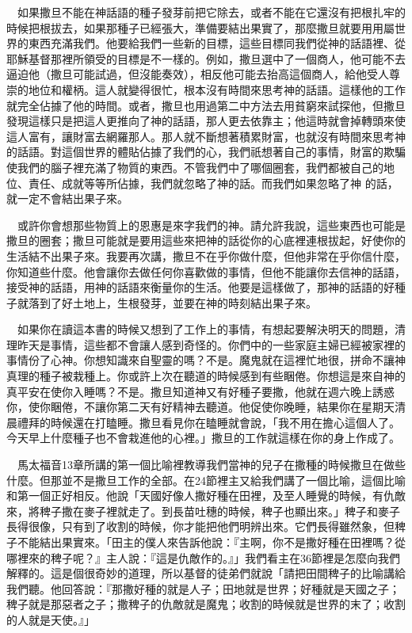 \documentclass{book}
\begin{document}
　如果撒旦不能在神話語的種子發芽前把它除去，或者不能在它還沒有把根扎牢的時候把根拔去，如果那種子已經張大，準備要結出果實了，那麼撒旦就要用用屬世界的東西充滿我們。他要給我們一些新的目標，這些目標同我們從神的話語裡、從耶穌基督那裡所領受的目標是不一樣的。例如，撒旦選中了一個商人，他可能不去逼迫他（撒旦可能試過，但沒能奏效），相反他可能去抬高這個商人，給他受人尊崇的地位和權柄。這人就變得很忙，根本沒有時間來思考神的話語。這樣他的工作就完全佔據了他的時間。或者，撒旦也用過第二中方法去用貧窮來試探他，但撒旦發現這樣只是把這人更推向了神的話語，那人更去依靠主；他這時就會掉轉頭來使這人富有，讓財富去網羅那人。那人就不斷想著積累財富，也就沒有時間來思考神的話語。對這個世界的體貼佔據了我們的心，我們祇想著自己的事情，財富的欺騙使我們的腦子裡充滿了物質的東西。不管我們中了哪個圈套，我們都被自己的地位、責任、成就等等所佔據，我們就忽略了神的話。而我們如果忽略了神 的話，就一定不會結出果子來。

　或許你會想那些物質上的恩惠是來字我們的神。請允許我說，這些東西也可能是撒旦的圈套；撒旦可能就是要用這些來把神的話從你的心底裡連根拔起，好使你的生活結不出果子來。我要再次講，撒旦不在乎你做什麼，但他非常在乎你信什麼，你知道些什麼。他會讓你去做任何你喜歡做的事情，但他不能讓你去信神的話語，接受神的話語，用神的話語來衡量你的生活。他要是這樣做了，那神的話語的好種子就落到了好土地上，生根發芽，並要在神的時刻結出果子來。

　如果你在讀這本書的時候又想到了工作上的事情，有想起要解決明天的問題，清理昨天是事情，這些都不會讓人感到奇怪的。你們中的一些家庭主婦已經被家裡的事情份了心神。你想知識來自聖靈的嗎？不是。魔鬼就在這裡忙地很，拼命不讓神真理的種子被栽種上。你或許上次在聽道的時候感到有些睏倦。你想這是來自神的真平安在使你入睡嗎？不是。撒旦知道神又有好種子要撒，他就在週六晚上誘惑你，使你睏倦，不讓你第二天有好精神去聽道。他促使你晚睡，結果你在星期天清晨禮拜的時候還在打瞌睡。撒旦看見你在瞌睡就會說，「我不用在擔心這個人了。今天早上什麼種子也不會栽進他的心裡。」撒旦的工作就這樣在你的身上作成了。

　馬太福音13章所講的第一個比喻裡教導我們當神的兒子在撒種的時候撒旦在做些什麼。但那並不是撒旦工作的全部。在24節裡主又給我們講了一個比喻，這個比喻和第一個正好相反。他說「天國好像人撒好種在田裡，及至人睡覺的時候，有仇敵來，將稗子撒在麥子裡就走了。到長苗吐穗的時候，稗子也顯出來。」稗子和麥子長得很像，只有到了收割的時候，你才能把他們明辨出來。它們長得雖然象，但稗子不能結出果實來。「田主的僕人來告訴他說：『主啊，你不是撒好種在田裡嗎？從哪裡來的稗子呢？』主人說：『這是仇敵作的。』」我們看主在36節裡是怎麼向我們解釋的。這是個很奇妙的道理，所以基督的徒弟們就說「請把田間稗子的比喻講給我們聽。他回答說：『那撒好種的就是人子；田地就是世界；好種就是天國之子；稗子就是那惡者之子；撒稗子的仇敵就是魔鬼；收割的時候就是世界的末了；收割的人就是天使。』」
\end{document}

